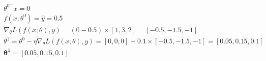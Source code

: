 \documentclass[a4paper]{article}
\theoremstyle{definition}
\newenvironment{soln}{
    \leavevmode\color{blue}\ignorespaces
}{}
\begin{document}
\begin{enumerate}
\begin{enumerate}
	\begin{soln}
            \begin{gather*}
                \theta^{0\top} x = 0\\
                f(x;\theta^0) = \hat{y} = 0.5\\
                \nabla_{\theta} L(f(x;\theta), y) = (0-0.5)\times[1, 3, 2] = [-0.5, -1.5, -1]\\
                \theta^{1} = \theta^{0} - \eta \nabla_{\theta} L(f(x;\theta), y) = [0,0,0] - 0.1\times[-0.5, -1.5, -1] = [0.05, 0.15, 0.1]\\
                \mathbf{\theta^{1} = [0.05, 0.15, 0.1]}
            \end{gather*}
        \end{soln}
\end{enumerate}
\end{enumerate}
\end{document}
